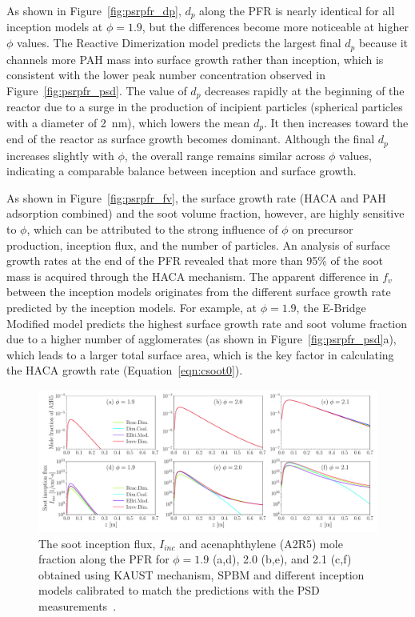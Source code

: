 As shown in Figure~\ref{fig:psrpfr_dp}, $d_p$ along the PFR is nearly identical for all inception models at $\phi = 1.9$, but the differences become more noticeable at higher $\phi$ values. The Reactive Dimerization model predicts the largest final $d_p$ because it channels more PAH mass into surface growth rather than inception, which is consistent with the lower peak number concentration observed in Figure~\ref{fig:psrpfr_psd}. The value of $d_p$ decreases rapidly at the beginning of the reactor due to a surge in the production of incipient particles (spherical particles with a diameter of 2~nm), which lowers the mean $d_p$. It then increases toward the end of the reactor as surface growth becomes dominant. Although the final $d_p$ increases slightly with $\phi$, the overall range remains similar across $\phi$ values, indicating a comparable balance between inception and surface growth. 

As shown in Figure~\ref{fig:psrpfr_fv}, the surface growth rate (HACA and PAH adsorption combined) and the soot volume fraction, however, are highly sensitive to $\phi$, which can be attributed to the strong influence of $\phi$ on precursor production, inception flux, and the number of particles. An analysis of surface growth rates at the end of the PFR revealed that more than 95\% of the soot mass is acquired through the HACA mechanism. The apparent difference in $f_v$ between the inception models originates from the different surface growth rate predicted by the inception models. For example, at $\phi = 1.9$, the E-Bridge Modified model predicts the highest surface growth rate and soot volume fraction due to a higher number of agglomerates (as shown in Figure~\ref{fig:psrpfr_psd}a), which leads to a larger total surface area, which is the key factor in calculating the HACA growth rate (Equation~\ref{eqn:csoot0}).


 


\begin{figure}[H]
	\centering
	\includegraphics[width=1\textwidth]{Figures/Results/PSR/I_inc_PAH_eq_ratio_all_single_mech.pdf}
	\caption{The soot inception flux, $I_{inc}$ and acenaphthylene (A2R5) mole fraction along the PFR for $\phi=1.9$ (a,d), 2.0 (b,e), and 2.1 (c,f) obtained using KAUST mechanism, SPBM and different inception models calibrated to match the predictions with the PSD measurements~\citep{manzello2007soot}.}
	\label{fig:psrpfr_Iinc_PAH} 
\end{figure}

